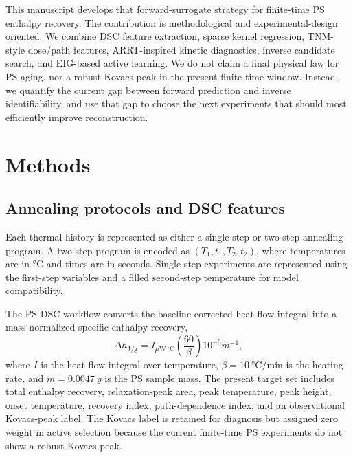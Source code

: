 \documentclass[11pt]{article}
\newcommand{\Tone}{\ensuremath{T_{1}}}
\newcommand{\ToneTime}{\ensuremath{t_{1}}}
\newcommand{\Ttwo}{\ensuremath{T_{2}}}
\newcommand{\TtwoTime}{\ensuremath{t_{2}}}
\begin{document}
This manuscript develops that forward-surrogate strategy for finite-time PS enthalpy recovery. The contribution is methodological and experimental-design oriented. We combine DSC feature extraction, sparse kernel regression, TNM-style dose/path features, ARRT-inspired kinetic diagnostics, inverse candidate search, and EIG-based active learning. We do not claim a final physical law for PS aging, nor a robust Kovacs peak in the present finite-time window. Instead, we quantify the current gap between forward prediction and inverse identifiability, and use that gap to choose the next experiments that should most efficiently improve reconstruction.

\section{Methods}
\subsection{Annealing protocols and DSC features}
Each thermal history is represented as either a single-step or two-step annealing program. A two-step program is encoded as $(\Tone,\ToneTime,\Ttwo,\TtwoTime)$, where temperatures are in \si{\celsius} and times are in seconds. Single-step experiments are represented using the first-step variables and a filled second-step temperature for model compatibility.

The PS DSC workflow converts the baseline-corrected heat-flow integral into a mass-normalized specific enthalpy recovery,
\begin{equation}
  \Delta h_{\mathrm{J/g}} =
  I_{\mu\mathrm{W}\,{}^{\circ}\mathrm{C}}
  \left(\frac{60}{\beta}\right)
  10^{-6} m^{-1},
  \label{eq:enthalpy_conversion}
\end{equation}
where $I$ is the heat-flow integral over temperature, $\beta=\SI{10}{\celsius\per\minute}$ is the heating rate, and $m=\SI{0.0047}{g}$ is the PS sample mass. The present target set includes total enthalpy recovery, relaxation-peak area, peak temperature, peak height, onset temperature, recovery index, path-dependence index, and an observational Kovacs-peak label. The Kovacs label is retained for diagnosis but assigned zero weight in active selection because the current finite-time PS experiments do not show a robust Kovacs peak.
\end{document}
